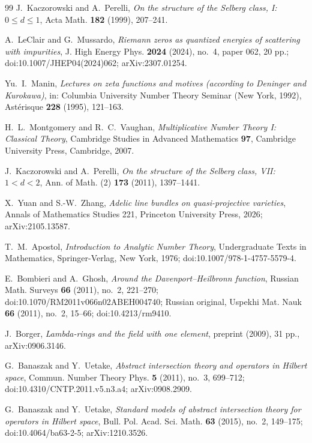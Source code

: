 \documentclass[11pt]{article}
\theoremstyle{plain}
\theoremstyle{definition}
\theoremstyle{remark}
\begin{document}
\begin{thebibliography}{99}
J.~Kaczorowski and A.~Perelli,
\emph{On the structure of the Selberg class, I: $0 \le d \le 1$},
Acta Math. \textbf{182} (1999), 207--241.

A.~LeClair and G.~Mussardo,
\emph{Riemann zeros as quantized energies of scattering with impurities},
J. High Energy Phys. \textbf{2024} (2024), no.~4, paper 062, 20 pp.;
doi:10.1007/JHEP04(2024)062;
arXiv:2307.01254.

Yu.~I.~Manin,
\emph{Lectures on zeta functions and motives (according to Deninger and
Kurokawa)},
in: Columbia University Number Theory Seminar (New York, 1992),
Ast\'erisque \textbf{228} (1995), 121--163.

H.~L.~Montgomery and R.~C.~Vaughan,
\emph{Multiplicative Number Theory I: Classical Theory},
Cambridge Studies in Advanced Mathematics \textbf{97},
Cambridge University Press, Cambridge, 2007.

J.~Kaczorowski and A.~Perelli,
\emph{On the structure of the Selberg class, VII: $1 < d < 2$},
Ann. of Math. (2) \textbf{173} (2011), 1397--1441.

X.~Yuan and S.-W.~Zhang,
\emph{Adelic line bundles on quasi-projective varieties},
Annals of Mathematics Studies 221, Princeton University Press, 2026;
arXiv:2105.13587.

T.~M.~Apostol,
\emph{Introduction to Analytic Number Theory},
Undergraduate Texts in Mathematics, Springer-Verlag, New York, 1976;
doi:10.1007/978-1-4757-5579-4.

E.~Bombieri and A.~Ghosh,
\emph{Around the Davenport--Heilbronn function},
Russian Math. Surveys \textbf{66} (2011), no.~2, 221--270;
doi:10.1070/RM2011v066n02ABEH004740;
Russian original, Uspekhi Mat. Nauk \textbf{66} (2011), no.~2, 15--66;
doi:10.4213/rm9410.

J.~Borger,
\emph{Lambda-rings and the field with one element},
preprint (2009), 31 pp., arXiv:0906.3146.

G.~Banaszak and Y.~Uetake,
\emph{Abstract intersection theory and operators in Hilbert space},
Commun. Number Theory Phys. \textbf{5} (2011), no.~3, 699--712;
doi:10.4310/CNTP.2011.v5.n3.a4;
arXiv:0908.2909.

G.~Banaszak and Y.~Uetake,
\emph{Standard models of abstract intersection theory for operators in Hilbert
space},
Bull. Pol. Acad. Sci. Math. \textbf{63} (2015), no.~2, 149--175;
doi:10.4064/ba63-2-5;
arXiv:1210.3526.


\end{thebibliography}
\end{document}
